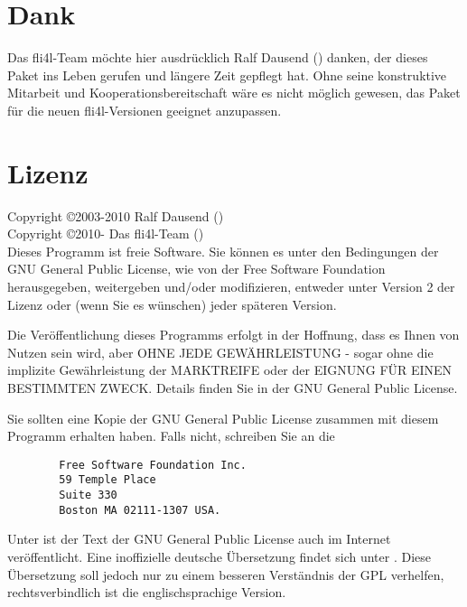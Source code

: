 \section{Dank}

Das fli4l-Team möchte hier ausdrücklich Ralf Dausend
() danken, der dieses Paket ins Leben gerufen und
längere Zeit gepflegt hat. Ohne seine konstruktive Mitarbeit und
Kooperationsbereitschaft wäre es nicht möglich gewesen, das Paket für die
neuen fli4l-Versionen geeignet anzupassen.

\section{Lizenz}

Copyright \copyright  2003-2010 Ralf Dausend () \\
Copyright \copyright  2010-     Das fli4l-Team () \\

Dieses Programm ist freie Software. Sie können es unter
den Bedingungen der GNU General Public License, wie von der
Free Software Foundation herausgegeben, weitergeben und/oder
modifizieren, entweder unter Version 2 der Lizenz oder (wenn
Sie es wünschen) jeder späteren Version.

Die Veröffentlichung dieses Programms erfolgt in der
Hoffnung, dass es Ihnen von Nutzen sein wird, aber OHNE JEDE
GEWÄHRLEISTUNG - sogar ohne die implizite Gewährleistung
der MARKTREIFE oder der EIGNUNG FÜR EINEN BESTIMMTEN ZWECK.
Details finden Sie in der GNU General Public License.

Sie sollten eine Kopie der GNU General Public License zusammen
mit diesem Programm erhalten haben. Falls nicht, schreiben Sie
an die

\begin{verbatim}
		Free Software Foundation Inc.
		59 Temple Place
		Suite 330
		Boston MA 02111-1307 USA.
\end{verbatim}

Unter  ist der Text der GNU General
Public License auch im Internet veröffentlicht. Eine
inoffizielle deutsche Übersetzung findet sich unter
.
Diese Übersetzung soll jedoch nur zu einem besseren Verständnis
der GPL verhelfen, rechtsverbindlich ist die englischsprachige Version.
